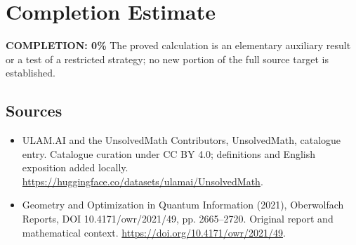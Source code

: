 \documentclass[11pt]{article}
\begin{document}
\section{Completion Estimate}
\noindent\textbf{COMPLETION: 0\%}
The proved calculation is an elementary auxiliary result or a test of a restricted strategy; no new portion of the full source target is established.

\subsection{Sources}
\begin{itemize}
\item[\hypertarget{source:statement:1}{S1}] ULAM.AI and the UnsolvedMath Contributors, UnsolvedMath, catalogue entry. Catalogue curation under CC BY 4.0; definitions and English exposition added locally.
\url{https://huggingface.co/datasets/ulamai/UnsolvedMath}.
\item[\hypertarget{source:statement:2}{S2}] Geometry and Optimization in Quantum Information (2021), Oberwolfach Reports, DOI 10.4171/owr/2021/49, pp. 2665--2720. Original report and mathematical context.
\url{https://doi.org/10.4171/owr/2021/49}.
\end{itemize}
\label{end:statement}
\end{document}
